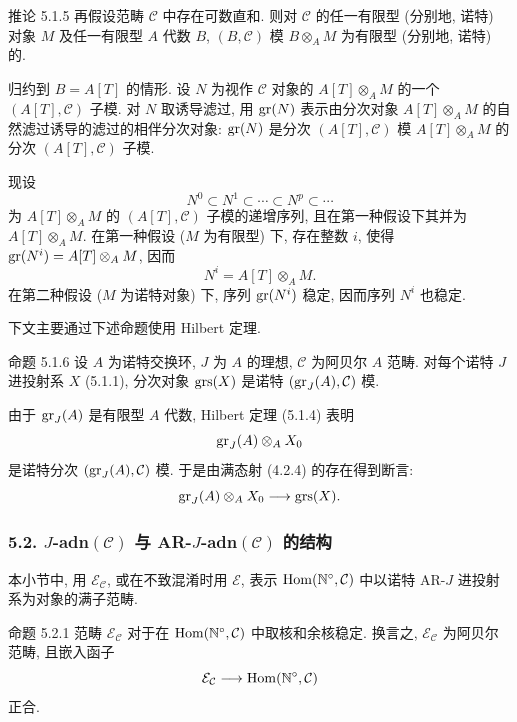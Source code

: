 \begin{statement}{推论 5.1.5}
再假设范畴 \(\mathcal C\) 中存在可数直和. 则对 \(\mathcal C\) 的任一有限型 (分别地, 诺特) 对象 \(M\) 及任一有限型 \(A\) 代数 \(B\), \((B,\mathcal C)\) 模 \(B\otimes_A M\) 为有限型 (分别地, 诺特) 的.
\end{statement}

\begin{prooftext}
归约到 \(B=A[T]\) 的情形. 设 \(N\) 为视作 \(\mathcal C\) 对象的 \(A[T]\otimes_A M\) 的一个 \((A[T],\mathcal C)\) 子模. 对 \(N\) 取诱导滤过, 用 \(\operatorname{gr}(N)\) 表示由分次对象 \(A[T]\otimes_A M\) 的自然滤过诱导的滤过的相伴分次对象: \(\operatorname{gr}(N)\) 是分次 \((A[T],\mathcal C)\) 模 \(A[T]\otimes_A M\) 的分次 \((A[T],\mathcal C)\) 子模.

现设
\[
N^0\subset N^1\subset\cdots\subset N^p\subset\cdots
\]
为 \(A[T]\otimes_A M\) 的 \((A[T],\mathcal C)\) 子模的递增序列, 且在第一种假设下其并为 \(A[T]\otimes_A M\). 在第一种假设 (\(M\) 为有限型) 下, 存在整数 \(i\), 使得 \(\operatorname{gr}(N^i)=A[T]\otimes_A M\), 因而
\[
N^i=A[T]\otimes_A M.
\]
在第二种假设 (\(M\) 为诺特对象) 下, 序列 \(\operatorname{gr}(N^i)\) 稳定, 因而序列 \(N^i\) 也稳定.

下文主要通过下述命题使用 Hilbert 定理.
\end{prooftext}

\begin{statement}{命题 5.1.6}
设 \(A\) 为诺特交换环, \(J\) 为 \(A\) 的理想, \(\mathcal C\) 为阿贝尔 \(A\) 范畴. 对每个诺特 \(J\) 进投射系 \(X\) (5.1.1), 分次对象 \(\operatorname{grs}(X)\) 是诺特 \((\operatorname{gr}_J(A),\mathcal C)\) 模.
\end{statement}

\begin{prooftext}
由于 \(\operatorname{gr}_J(A)\) 是有限型 \(A\) 代数, Hilbert 定理 (5.1.4) 表明
\[
\operatorname{gr}_J(A)\otimes_A X_0
\]
是诺特分次 \((\operatorname{gr}_J(A),\mathcal C)\) 模. 于是由满态射 (4.2.4) 的存在得到断言:
\[
\operatorname{gr}_J(A)\otimes_A X_0\longrightarrow \operatorname{grs}(X).
\]
\end{prooftext}

\subsubsection*{5.2. \(J\)-adn\((\mathcal C)\) 与 AR-\(J\)-adn\((\mathcal C)\) 的结构}

本小节中, 用 \(\mathcal E_{\mathcal C}\), 或在不致混淆时用 \(\mathcal E\), 表示 \(\operatorname{Hom}(\mathbb N^\circ,\mathcal C)\) 中以诺特 AR-\(J\) 进投射系为对象的满子范畴.

\begin{statement}{命题 5.2.1}
范畴 \(\mathcal E_{\mathcal C}\) 对于在 \(\operatorname{Hom}(\mathbb N^\circ,\mathcal C)\) 中取核和余核稳定. 换言之, \(\mathcal E_{\mathcal C}\) 为阿贝尔范畴, 且嵌入函子
\[
\mathcal E_{\mathcal C}\longrightarrow \operatorname{Hom}(\mathbb N^\circ,\mathcal C)
\]
正合.
\end{statement}

